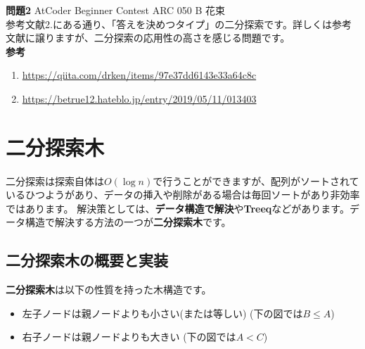 \noindent \textbf{問題2} AtCoder Beginner Contest ARC 050 B 花束\\
参考文献2.にある通り、「答えを決めつタイプ」の二分探索です。詳しくは参考文献に譲りますが、二分探索の応用性の高さを感じる問題です。\\

\textbf{参考}
\begin{enumerate}
  \item \url{https://qiita.com/drken/items/97e37dd6143e33a64c8c}
  \item \url{https://betrue12.hateblo.jp/entry/2019/05/11/013403}
\end{enumerate}

\newpage

\section{二分探索木}
二分探索は探索自体は$O(\log n)$で行うことができますが、配列がソートされているひつようがあり、データの挿入や削除がある場合は毎回ソートがあり非効率ではあります。
解決策としては、\textbf{データ構造で解決}や\textbf{Treeq}などがあります。データ構造で解決する方法の一つが\textbf{二分探索木}です。

\subsection{二分探索木の概要と実装}

\textbf{二分探索木}は以下の性質を持った木構造です。

\begin{itemize}
  \item 左子ノードは親ノードよりも小さい(または等しい) (下の図では$B \leq A$)
  \item 右子ノードは親ノードよりも大きい (下の図では$A < C$)
\end{itemize}

\begin{center}
\end{center}

